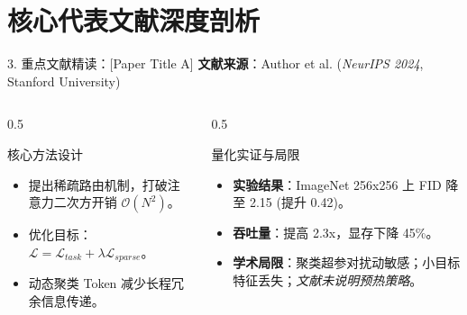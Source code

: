 \documentclass[aspectratio=169,10pt,UTF8]{ctexbeamer}
\begin{document}
\section{核心代表文献深度剖析}
\begin{frame}{3. 重点文献精读：[Paper Title A]}
  \small
  \textbf{文献来源}：Author et al. (\textit{NeurIPS 2024}, Stanford University)
  \begin{columns}[T]
    \begin{column}{0.5\textwidth}
      \begin{block}{核心方法设计}
        \begin{itemize}
          \item 提出稀疏路由机制，打破注意力二次方开销 $\mathcal{O}(N^2)$。
          \item 优化目标：$\mathcal{L} = \mathcal{L}_{task} + \lambda \mathcal{L}_{sparse}$。
          \item 动态聚类 Token 减少长程冗余信息传递。
        \end{itemize}
      \end{block}
    \end{column}
    \begin{column}{0.5\textwidth}
      \begin{block}{量化实证与局限}
        \begin{itemize}
          \item \textbf{实验结果}：ImageNet 256x256 上 FID 降至 2.15 (提升 0.42)。
          \item \textbf{吞吐量}：提高 2.3x，显存下降 45\%。
          \item \textbf{学术局限}：聚类超参对扰动敏感；小目标特征丢失；\textit{文献未说明预热策略}。
        \end{itemize}
      \end{block}
    \end{column}
  \end{columns}
\end{frame}

\end{document}
